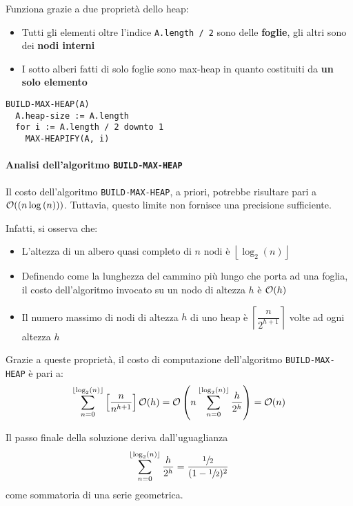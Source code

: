 \documentclass[italian, 10pt]{article}
\begin{document}
Funziona grazie a due proprietà dello heap:

\begin{itemize}
  \item Tutti gli elementi oltre l'indice \texttt{A.length / 2} sono delle \textbf{foglie}, gli altri sono dei \textbf{nodi interni}
  \item I sotto alberi fatti di solo foglie sono max-heap in quanto costituiti da \textbf{un solo elemento}
\end{itemize}

\begin{lstlisting}[style=pseudocode, caption={Algoritmo \texttt{BUILD-MAX-HEAP}}, label={lst:algoritmo-build-max-heap}]
BUILD-MAX-HEAP(A)
  A.heap-size := A.length
  for i := A.length / 2 downto 1
    MAX-HEAPIFY(A, i)
\end{lstlisting}

\paragraph{Analisi dell'algoritmo \texttt{BUILD-MAX-HEAP}}

Il costo dell'algoritmo \texttt{BUILD-MAX-HEAP}, a priori, potrebbe risultare pari a \(\mathcal{O}(\left(n \log{(n)}\right))\).
Tuttavia, questo limite non fornisce una precisione sufficiente.

Infatti, si osserva che:

\begin{itemize}
  \item L'altezza di un albero quasi completo di \(n\) nodi è \(\left\lfloor \log_2(n) \right\rfloor\)
  \item Definendo come  la lunghezza del cammino più lungo che porta ad una foglia, il costo dell'algoritmo invocato su un nodo di altezza \(h\) è \(\mathcal{O}(h)\)
  \item Il numero massimo di nodi di altezza \(h\) di uno heap è \(\left\lceil \dfrac{n}{2^{h+1}} \right\rceil\) volte ad ogni altezza \(h\)
\end{itemize}

Grazie a queste proprietà, il costo di computazione dell'algoritmo \texttt{BUILD-MAX-HEAP} è pari a:
\[ \displaystyle \sum_{n=0}^{\left\lfloor \log_2(n) \right\rfloor} \left[ \dfrac{n}{n^{h+1}} \right] \mathcal{O}(h) = \mathcal{O} \left(n \displaystyle \sum_{n=0}^{\left\lfloor \log_2(n) \right\rfloor} \dfrac{h}{2^h} \right) = \mathcal{O} (n)\]

Il passo finale della soluzione deriva dall'uguaglianza
\[ \sum_{n=0}^{\left\lfloor \log_2(n) \right\rfloor} \dfrac{h}{2^h} = \dfrac{\sfrac{1}{2}}{(1 - \sfrac{1}{2})^2} \]
come sommatoria di una serie geometrica.
\end{document}
